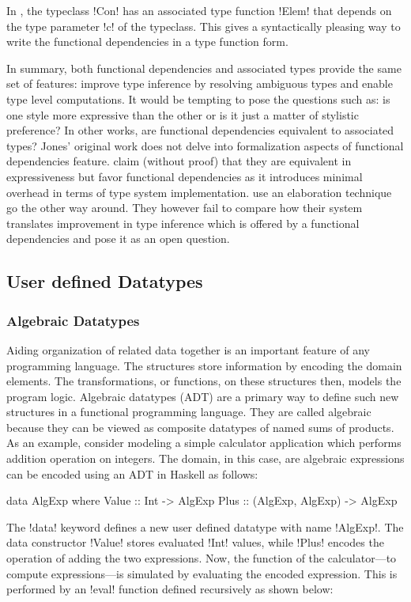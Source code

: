 \documentclass[screen,nonacm]{acmart}
\begin{document}
In , the typeclass !Con! has an associated type function !Elem! that depends on the type parameter !c! of the typeclass. This gives a syntactically pleasing way to write the functional dependencies in a type function form.

In summary, both functional dependencies and associated types provide the same set of features: improve type inference by resolving ambiguous types and enable type level computations. It would be tempting to pose the questions such as: is one style more expressive than the other or is it just a matter of stylistic preference? In other works, are functional dependencies equivalent to associated types? Jones' original work does not delve into formalization aspects of functional dependencies feature. \citet{jones_language_2008} claim (without proof) that they are equivalent in expressiveness but favor functional dependencies as it introduces minimal overhead in terms of type system implementation. \citet{karachalias_elaboration_2017} use an elaboration technique go the other way around. They however fail to compare how their system translates improvement in type inference which is offered by a functional dependencies and pose it as an open question.

\subsection{User defined Datatypes}
\subsubsection{Algebraic Datatypes}
Aiding organization of related data together is an important feature of any programming language. The structures store information by encoding the domain elements. The transformations, or functions, on these structures then, models the program logic. Algebraic datatypes (ADT) are a primary way to define such new structures in a functional programming language. They are called algebraic because they can be viewed as composite datatypes of named sums of products. As an example, consider modeling a simple calculator application which performs addition operation on integers. The domain, in this case, are algebraic expressions can be encoded using an ADT in Haskell as follows:

\begin{CenteredBox}
\begin{code}
data AlgExp where
   Value :: Int -> AlgExp
   Plus :: (AlgExp, AlgExp) -> AlgExp
\end{code}
\end{CenteredBox}
The !data! keyword defines a new user defined datatype with name !AlgExp!.
The data constructor !Value! stores evaluated !Int! values, while !Plus! encodes the operation of adding the two expressions. Now, the function of the calculator---to compute expressions---is simulated by evaluating the encoded expression. This is performed by an !eval! function defined recursively as shown below:
\end{document}
